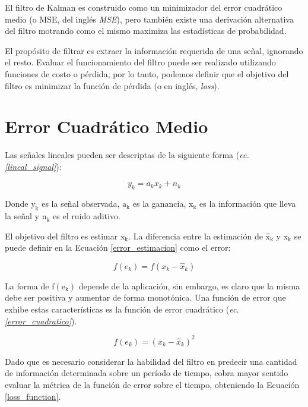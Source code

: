 \documentclass[10pt, a4paper]{report}
\begin{document}
\noindent El filtro de Kalman es construido como un minimizador del error 
cuadr\'atico medio (o \acrshort{MSE}, del ingl\'es 
\emph{\acrlong{MSE}}), pero tambi\'en existe una derivaci\'on 
alternativa del filtro motrando como el mismo maximiza las estad\'isticas de 
probabilidad.

\noindent El prop\'osito de filtrar es extraer la informaci\'on requerida de una
señal, ignorando el resto. Evaluar el funcionamiento del filtro puede ser
realizado utilizando funciones de costo o p\'erdida, por lo tanto, podemos
definir que el objetivo del filtro es minimizar la funci\'on de p\'erdida (o en
ingl\'es, \emph{loss}).

\section{Error Cuadr\'atico Medio}

\noindent Las señales lineales pueden ser descriptas de la siguiente forma
(\emph{ec.\ref{lineal_signal}}):

\begin{equation}
    y_k = a_k x_k + n_k \label{lineal_signal}
\end{equation}

\noindent Donde $\mathrm{y_k}$ es la señal observada, $\mathrm{a_k}$ es la 
ganancia, $\mathrm{x_k}$ es la informaci\'on que lleva la señal y $\mathrm{n_k}$ 
es el ruido aditivo.

\noindent El objetivo del filtro es estimar $\mathrm{x_k}$. La diferencia entre
la estimaci\'on de $\mathrm{\hat{x}_k}$ y $\mathrm{x_k}$ se puede definir en la
Ecuaci\'on \ref{error_estimacion} como el error:

\begin{equation}
    f(e_k) = f(x_k - \hat{x}_k) \label{error_estimacion}
\end{equation}

La forma de $\mathrm{f(e_k)}$ depende de la aplicaci\'on, sin embargo, es claro
que la misma debe ser positiva y aumentar de forma monot\'onica. Una funci\'on
de error que exhibe estas caracter\'isticas es la funci\'on de error
cuadr\'atico (\emph{ec. \ref{error_cuadratico}}).

\begin{equation}
    f(e_k) = (x_k - \hat{x}_k)^2 \label{error_cuadratico}
\end{equation}

Dado que es necesario considerar la habilidad del filtro en predecir una
cantidad de informaci\'on determinada sobre un per\'iodo de tiempo, cobra mayor
sentido evaluar la m\'etrica de la funci\'on de error sobre el tiempo,
obteniendo la Ecuaci\'on \ref{loss_function}.
\end{document}
